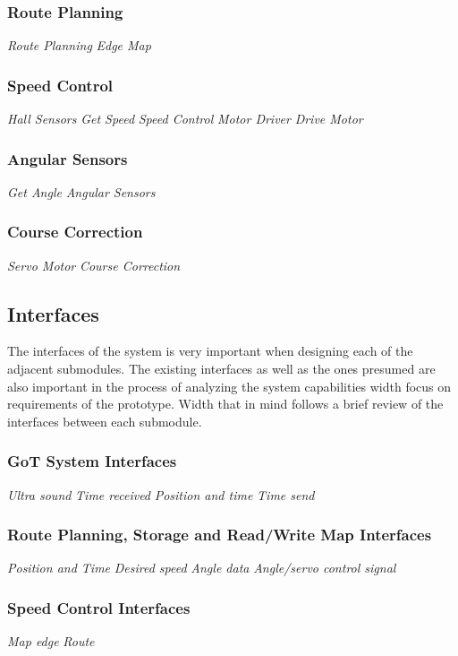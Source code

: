 \subsubsection{Route Planning}
\textit{Route Planning} \textit{Edge Map}

\subsubsection{Speed Control}
\textit{Hall Sensors} \textit{Get Speed} \textit{Speed Control} \textit{Motor Driver} \textit{Drive Motor}

\subsubsection{Angular Sensors}
\textit{Get Angle} \textit{Angular Sensors}

\subsubsection{Course Correction}
\textit{Servo Motor} \textit{Course Correction}

\subsection{Interfaces}
The interfaces of the system is very important when designing each of the adjacent submodules. The existing interfaces as well as the ones presumed are also important in the process of analyzing the system capabilities width focus on requirements of the prototype. Width that in mind follows a brief review of the interfaces between each submodule.

\subsubsection{GoT System Interfaces}
\textit{Ultra sound} \textit{Time received} \textit{Position and time} \textit{Time send}

\subsubsection{Route Planning, Storage and Read/Write Map Interfaces}
\textit{Position and Time} \textit{Desired speed} \textit{Angle data} \textit{Angle/servo control signal}

\subsubsection{Speed Control Interfaces}
\textit{Map edge} \textit{Route}

